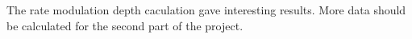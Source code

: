 The rate modulation depth caculation gave interesting results.
More data should be calculated for the second part of the project.